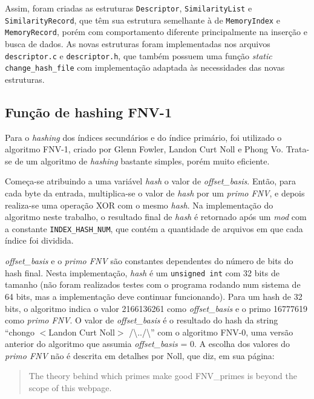 \documentclass[a4paper,10pt]{article}
\begin{document}
Assim, foram criadas as estruturas \texttt{Descriptor}, \texttt{SimilarityList} e \texttt{SimilarityRecord}, que têm sua estrutura semelhante à de \texttt{MemoryIndex} e \texttt{MemoryRecord}, porém com comportamento diferente principalmente na inserção e busca de dados. As novas estruturas foram implementadas nos arquivos \texttt{descriptor.c} e \texttt{descriptor.h}, que também possuem uma função \textit{static} \texttt{change\_hash\_file} com implementação adaptada às necessidades das novas estruturas.

\subsection{Função de hashing FNV-1}\label{fnv1}
Para o \textit{hashing} dos índices secundários e do índice primário, foi utilizado o algoritmo FNV-1, criado por Glenn Fowler, Landon Curt Noll e Phong Vo\cite{fnv1ref,fnv1wiki}. Trata-se de um algoritmo de \textit{hashing} bastante simples, porém muito eficiente.

Começa-se atribuindo a uma variável \textit{hash} o valor de \textit{offset\_basis}. Então, para cada byte da entrada, multiplica-se o valor de \textit{hash} por um \textit{primo FNV}, e depois realiza-se uma operação XOR com o mesmo \textit{hash}. Na implementação do algoritmo neste trabalho, o resultado final de \textit{hash} é retornado após um \textit{mod} com a constante \texttt{INDEX\_HASH\_NUM}, que contém a quantidade de arquivos em que cada índice foi dividida.

\textit{offset\_basis} e o \textit{primo FNV} são constantes dependentes do número de bits do hash final. Nesta implementação, \textit{hash} é um \texttt{unsigned int} com 32 bits de tamanho (não foram realizados testes com o programa rodando num sistema de 64 bits, mas a implementação deve continuar funcionando). Para um hash de 32 bits, o algoritmo indica o valor 2166136261 como \textit{offset\_basis} e o primo 16777619 como \textit{primo FNV}. O valor de \textit{offset\_basis} é o resultado do hash da string ``chongo $<$Landon Curt Noll$>$ /\textbackslash../\textbackslash'' com o algoritmo FNV-0, uma versão anterior do algoritmo que assumia \textit{offset\_basis} = 0. A escolha dos valores do \textit{primo FNV} não é descrita em detalhes por Noll, que diz, em sua página:

\begin{quote}
The theory behind which primes make good FNV\_primes is beyond the scope of this webpage.
\end{quote}
\end{document}
